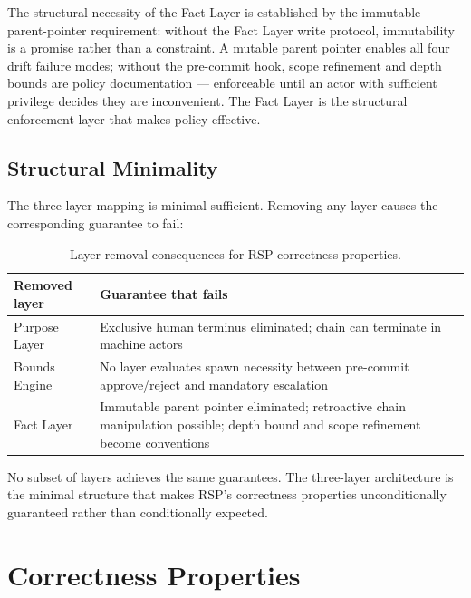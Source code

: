 \medskip
The structural necessity of the Fact Layer is established by the immutable-parent-pointer requirement: without the Fact Layer write protocol, immutability is a promise rather than a constraint. A mutable parent pointer enables all four drift failure modes; without the pre-commit hook, scope refinement and depth bounds are policy documentation — enforceable until an actor with sufficient privilege decides they are inconvenient. The Fact Layer is the structural enforcement layer that makes policy effective.

\subsection{Structural Minimality}
\label{sec:rs-minimality}

The three-layer mapping is minimal-sufficient. Removing any layer causes the corresponding guarantee to fail:

\begin{table}[h]
\centering
\begin{tabular}{p{3.0cm} p{5.2cm}}
\toprule
\textbf{Removed layer} & \textbf{Guarantee that fails} \\
\midrule
Purpose Layer         & Exclusive human terminus eliminated; chain can terminate in machine actors \\
Bounds Engine         & No layer evaluates spawn necessity between pre-commit approve/reject and mandatory escalation \\
Fact Layer            & Immutable parent pointer eliminated; retroactive chain manipulation possible; depth bound and scope refinement become conventions \\
\bottomrule
\end{tabular}
\caption{Layer removal consequences for RSP correctness properties.}
\label{tab:layer-minimality}
\end{table}

No subset of layers achieves the same guarantees. The three-layer architecture is the minimal structure that makes RSP's correctness properties unconditionally guaranteed rather than conditionally expected.

\section{Correctness Properties}
\label{sec:rs-correctness}

